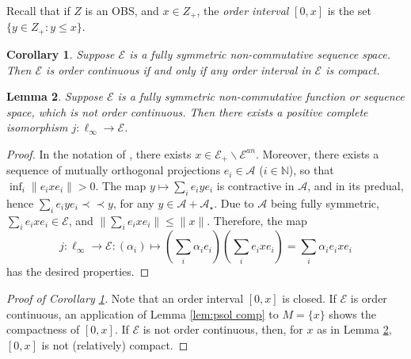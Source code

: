 \documentclass[12pt]{amsart}
\theoremstyle{plain}
\newtheorem{theorem}{Theorem}[subsection]
\newtheorem{corollary}[theorem]{Corollary}
\newtheorem{lemma}[theorem]{Lemma}
\theoremstyle{definition}
\renewcommand{\leq}{\leqslant}
\newcommand{\N}{\mathbb N}
\newcommand{\ce}{\mathcal E}
\newcommand{\A}{\mathcal{A}}
\newcommand{\pprec}{\prec \!\! \prec}
\newcommand{\psol}{\mathbf{PSol}}
\begin{document}
Recall that if $Z$ is an OBS, and $x \in Z_+$, the \emph{order interval}
$[0,x]$ is the set $\{y \in Z_+ : y \leq x\}$.

\begin{corollary}\label{cor:crit OC}
Suppose $\ce$ is a fully symmetric non-commutative sequence space.
Then $\ce$ is order continuous if and only if any order interval
in $\ce$ is compact.
\end{corollary}

\begin{lemma}\label{lem:+l_infty}
Suppose $\ce$ is a fully symmetric non-commutative function or
sequence space, which is not order continuous. Then there exists
a positive complete isomorphism $j : \ell_\infty \to \ce$.
\end{lemma}


\begin{proof}
In the notation of \cite[Section 6]{DdP12}, there exists
$x \in \ce_+ \backslash \ce^{an}$. Moreover, there exists
a sequence of mutually orthogonal projections $e_i \in \A$
($i \in \N$), so that $\inf_i \|e_i x e_i\| > 0$. The map
$y \mapsto \sum_i e_i y e_i$ is contractive in $\A$, and
in its predual, hence $\sum_i e_i y e_i \pprec y$, for any
$y \in \A + \A_\star$. Due to $\A$ being fully symmetric,
$\sum_i e_i x e_i \in \ce$, and $\|\sum_i e_i x e_i\| \leq \|x\|$.
Therefore, the map
$$
j : \ell_\infty \to \ce : (\alpha_i) \mapsto
 (\sum_i \alpha_i e_i) (\sum_i e_i x e_i) = \sum_i \alpha_i e_i x e_i
$$
has the desired properties.
\end{proof}


\begin{proof}[Proof of Corollary \ref{cor:crit OC}]
Note that an order interval $[0,x]$ is closed. If $\ce$
is order continuous, an application of Lemma \ref{lem:psol comp}
to $M = \{x\}$ shows the compactness of $[0,x]$. 
If $\ce$ is not order continuous, then, for $x$ as in
Lemma \ref{lem:+l_infty}, $[0,x]$ is not (relatively) compact.
\end{proof}





\end{document}
